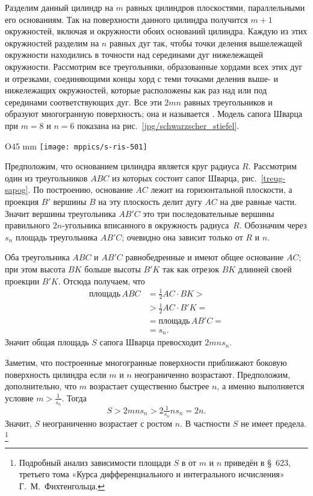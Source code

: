 Разделим данный цилиндр на $m$ равных цилиндров плоскостями, параллельными его основаниям.
Так на поверхности данного цилиндра получится $m+1$ окружностей, включая и окружности обоих оснований цилиндра.
Каждую из этих окружностей разделим на $n$ равных дуг так, чтобы точки деления вышележащей окружности находились в точности над серединами дуг нижележащей окружности.
Рассмотрим все треугольники, образованные хордами всех этих дуг и отрезками, соединяющими концы хорд с теми точками деления выше- и нижележащих окружностей, которые расположены как раз над или под серединами соответствующих дуг.
Все эти $2mn$ равных треугольников и образуют многогранную поверхность; 
она и называется .
Модель сапога Шварца при $m=8$ и $n=6$ показана на рис.~\ref{jpg/schwarzscher_stiefel}.


\begin{wrapfigure}{O}{45 mm}
\centering
\texttt{[image: mppics/s-ris-501]}
\caption{}\label{treug-sapog}
\end{wrapfigure}

Предположим, что основанием цилиндра является круг радиуса $R$.
Рассмотрим один из треугольников $ABC$ из которых состоит сапог Шварца, рис.~\ref{treug-sapog}.
По построению, основание $AC$ лежит на горизонтальной плоскости,
а проекция $B'$ вершины $B$ на эту плоскость делит дугу $AC$ на две равные части.
Значит вершины треугольника $AB'C$ это три последовательные вершины правильного $2n$-угольника вписанного в окружность радиуса~$R$.
Обозначим через $s_n$ площадь треугольника $AB'C$; очевидно она зависит только от $R$ и $n$.
 
Оба треугольника $ABC$ и $AB'C$ равнобедренные и имеют общее основание $AC$;
при этом высота $BK$ больше высоты $B'K$ так как отрезок $BK$ длинней своей проекции $B'K$.
Отсюда получаем, что
\begin{align*}
\text{площадь}\, ABC&=\tfrac12 AC\cdot BK>
\\
&>\tfrac12 AC\cdot B'K=
\\
&=\text{площадь}\, AB'C=
\\
&=s_n.
\end{align*}
Значит общая площадь $S$ сапога Шварца превосходит $2mns_n$.

Заметим, что построенные многогранные поверхности приближают боковую поверхность цилиндра если $m$ и $n$ неограниченно возрастают.
Предположим, дополнительно, что $m$ возрастает существенно быстрее $n$,
а именно выполняется условие $m>\tfrac1{s_n}$.
Тогда
\[S> 2 m n s_n>2 \tfrac1{s_n} n s_n=2n.\]
Значит, $S$ неограниченно возрастает с ростом $n$.
В частности $S$ не имеет предела.%
\footnote{Подробный анализ зависимости площади $S$ в от $m$ и $n$ приведён в §~623, третьего тома  «Курса дифференциального и интегрального исчисления» Г.~М.~Фихтенгольца.}


